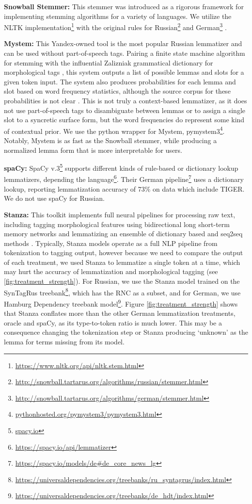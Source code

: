 \documentclass[11pt,a4paper]{article}
\begin{document}
\textbf{Snowball Stemmer:} This stemmer was introduced as a rigorous framework for implementing stemming algorithms for a variety of languages. We utilize the NLTK implementation\footnote{\url{https://www.nltk.org/api/nltk.stem.html}} with the original rules for Russian\footnote{\url{http://snowball.tartarus.org/algorithms/russian/stemmer.html}} and German\footnote{\url{http://snowball.tartarus.org/algorithms/german/stemmer.html}} \cite{snowball}.


\textbf{Mystem:} This Yandex-owned tool is the most popular Russian lemmatizer and can be used without part-of-speech tags. Pairing a finite state machine algorithm for stemming with the influential Zalizniak grammatical dictionary for morphological tags \cite{zaliznyak1977}, this system outputs a list of possible lemmas and slots for a given token input. The system also produces probabilities for each lemma and slot based on word frequency statistics, although the source corpus for these probabilities is not clear \cite{Segalovich2003AFM}. This is not truly a context-based lemmatizer, as it does not use part-of-speech tags to disambiguate between lemmas or to assign a single slot to a syncretic surface form, but the word frequencies do represent some kind of contextual prior. We use the python wrapper for Mystem, pymystem3\footnote{\url{pythonhosted.org/pymystem3/pymystem3.html}}. Notably, Mystem is as fast as the Snowball stemmer, while producing a normalized lemma form that is more interpretable for users.

\textbf{spaCy:} SpaCy v.3\footnote{\url{spacy.io}} supports different kinds of rule-based or dictionary lookup lemmatizers, depending the language\footnote{\url{https://spacy.io/api/lemmatizer}}. Their German pipeline\footnote{\url{https://spacy.io/models/de\#de\_core\_news\_lg}} uses a dictionary lookup, reporting lemmatization accuracy of 73\% on data which include TIGER. We do not use spaCy for Russian.


\textbf{Stanza:} This toolkit implements full neural pipelines for processing raw text, including tagging morphological features using bidirectional long short-term memory networks and lemmatizing an ensemble of dictionary based and seq2seq methods \cite{qi2020stanza}. Typically, Stanza models operate as a full NLP pipeline from tokenization to tagging output, however because we need to compare the output of each treatment, we used Stanza to lemmatize a single token at a time, which may hurt the accuracy of lemmatization and morphological tagging (see \ref{fig:treatment_strength}). For Russian, we use the Stanza model trained on the SynTagRus treebank\footnote{\url{https://universaldependencies.org/treebanks/ru_syntagrus/index.html}}, which has the RNC as a subset, and for German, we use Hamburg Dependency treebank model\footnote{\url{https://universaldependencies.org/treebanks/de_hdt/index.html}}. Figure \ref{fig:treatment_strength} shows that Stanza conflates more than the other German lemmatization treatments, oracle and spaCy, as its type-to-token ratio is much lower. This may be a consequence changing the tokenization step or Stanza producing `unknown' as the lemma for terms missing from its model.
\end{document}
